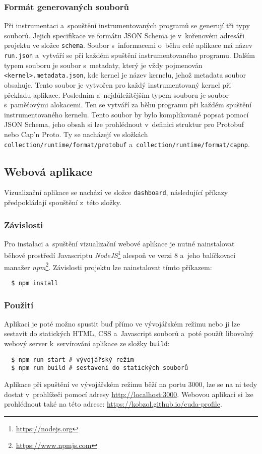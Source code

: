 \subsubsection{Formát generovaných souborů}
Při instrumentaci a~spouštění instrumentovaných programů se generují tři typy souborů. Jejich specifikace ve formátu JSON Schema je v~kořenovém adresáři projektu ve složce \texttt{schema}. Soubor s~informacemi o~běhu celé aplikace má název \texttt{run.json} a~vytváří se při každém spuštění instrumentovaného programu. Dalším typem souboru je soubor s~metadaty, který je vždy pojmenován \texttt{<kernel>.metadata.json}, kde kernel je název kernelu, jehož metadata soubor obsahuje. Tento soubor je vytvořen pro každý instrumentovaný kernel při překladu aplikace. Posledním a~nejdůležitějším typem souboru je soubor s~paměťovými alokacemi. Ten se vytváří za běhu programu při každém spuštění instrumentovaného kernelu. Tento soubor by bylo komplikované popsat pomocí JSON Schema, jeho obsah si lze prohlédnout v~definici struktur pro Protobuf nebo Cap'n Proto. Ty se nacházejí ve složkách \texttt{collection/runtime/format/protobuf} a~\texttt{collection/runtime/format/capnp}.

\subsection{Webová aplikace}
Vizualizační aplikace se nachází ve složce \texttt{dashboard}, následující příkazy předpokládají spouštění z~této složky.

\subsubsection{Závislosti}
Pro instalaci a~spuštění vizualizační webové aplikace je nutné nainstalovat běhové prostředí Javascriptu \emph{NodeJS}\footnote{\url{https://nodejs.org}} alespoň ve verzi 8 a~jeho balíčkovací manažer \emph{npm}\footnote{\url{https://www.npmjs.com}}. Závislosti projektu lze nainstalovat tímto příkazem:
\begin{verbatim}
  $ npm install
\end{verbatim}

\subsubsection{Použití}
Aplikaci je poté možno spustit buď přímo ve vývojářském režimu nebo ji lze sestavit do statických HTML, CSS a~Javascript souborů a~poté použít libovolný webový server k~servírování aplikace ze složky \texttt{build}:
\begin{verbatim}
  $ npm run start # vývojářský režim
  $ npm run build # sestavení do statických souborů
\end{verbatim}

Aplikace při spuštění ve vývojářském režimu běží na portu 3000, lze se na ni tedy dostat v~prohlížeči pomocí adresy \url{http://localhost:3000}.
Webovou aplikaci si lze prohlédnout také na této adrese: \url{https://kobzol.github.io/cuda-profile}.
